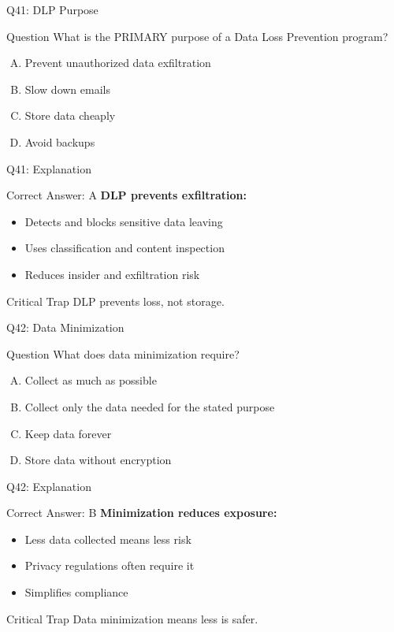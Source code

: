 \documentclass{beamer}
\begin{document}
	\begin{frame}{Q41: DLP Purpose}
		\begin{block}{Question}
			What is the PRIMARY purpose of a Data Loss Prevention program?
		\end{block}
		\begin{enumerate}[(A)]
			\item Prevent unauthorized data exfiltration
			\item Slow down emails
			\item Store data cheaply
			\item Avoid backups
		\end{enumerate}
	\end{frame}
	
	\begin{frame}{Q41: Explanation}
		\begin{block}{Correct Answer: A}
			\textbf{DLP prevents exfiltration:}
			\begin{itemize}
				\item Detects and blocks sensitive data leaving
				\item Uses classification and content inspection
				\item Reduces insider and exfiltration risk
			\end{itemize}
		\end{block}
		\begin{alertblock}{Critical Trap}
			DLP prevents loss, not storage.
		\end{alertblock}
	\end{frame}
	
	\begin{frame}{Q42: Data Minimization}
		\begin{block}{Question}
			What does data minimization require?
		\end{block}
		\begin{enumerate}[(A)]
			\item Collect as much as possible
			\item Collect only the data needed for the stated purpose
			\item Keep data forever
			\item Store data without encryption
		\end{enumerate}
	\end{frame}
	
	\begin{frame}{Q42: Explanation}
		\begin{block}{Correct Answer: B}
			\textbf{Minimization reduces exposure:}
			\begin{itemize}
				\item Less data collected means less risk
				\item Privacy regulations often require it
				\item Simplifies compliance
			\end{itemize}
		\end{block}
		\begin{alertblock}{Critical Trap}
			Data minimization means less is safer.
		\end{alertblock}
	\end{frame}
	
\end{document}
